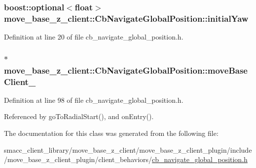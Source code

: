 \subsubsection[{\texorpdfstring{initial\+Yaw}{initialYaw}}]{\setlength{\rightskip}{0pt plus 5cm}boost\+::optional$<$float$>$ move\+\_\+base\+\_\+z\+\_\+client\+::\+Cb\+Navigate\+Global\+Position\+::initial\+Yaw}\hypertarget{classmove__base__z__client_1_1CbNavigateGlobalPosition_a339ec9b992e2565f404d8a2fa8a5be87}{}\label{classmove__base__z__client_1_1CbNavigateGlobalPosition_a339ec9b992e2565f404d8a2fa8a5be87}


Definition at line 20 of file cb\+\_\+navigate\+\_\+global\+\_\+position.\+h.

\subsubsection[{\texorpdfstring{move\+Base\+Client\+\_\+}{moveBaseClient_}}]{$\ast$ move\+\_\+base\+\_\+z\+\_\+client\+::\+Cb\+Navigate\+Global\+Position\+::move\+Base\+Client\+\_\+\hspace{0.3cm}{\ttfamily [private]}}\hypertarget{classmove__base__z__client_1_1CbNavigateGlobalPosition_a418cb1a461d6f28cb34908b739298657}{}\label{classmove__base__z__client_1_1CbNavigateGlobalPosition_a418cb1a461d6f28cb34908b739298657}


Definition at line 98 of file cb\+\_\+navigate\+\_\+global\+\_\+position.\+h.



Referenced by go\+To\+Radial\+Start(), and on\+Entry().



The documentation for this class was generated from the following file\+:\begin{DoxyCompactItemize}
\item 
smacc\+\_\+client\+\_\+library/move\+\_\+base\+\_\+z\+\_\+client/move\+\_\+base\+\_\+z\+\_\+client\+\_\+plugin/include/move\+\_\+base\+\_\+z\+\_\+client\+\_\+plugin/client\+\_\+behaviors/\hyperlink{cb__navigate__global__position_8h}{cb\+\_\+navigate\+\_\+global\+\_\+position.\+h}\end{DoxyCompactItemize}
